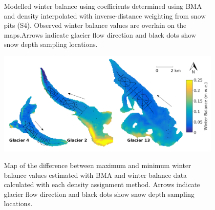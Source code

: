 \documentclass{sfuthesis}
\newcommand{\topomap}{Arrows indicate glacier flow direction and black dots show snow depth sampling locations. }
\begin{document}
\begin{figure}[H]
	\caption{Modelled winter balance using coefficients determined using BMA and density interpolated with inverse-distance weighting from snow pits (S4). Observed winter balance values are overlain on the maps.\topomap}
	\label{fig:BMSmodelledSWE}
\end{figure}

\begin{figure}[H]
	\centering
	\includegraphics[width =\textwidth]{BMS_SWEdifferenceMap.png}\\
	\caption{Map of the difference between maximum and minimum winter balance values estimated with BMA and winter balance data calculated with each density assignment method. \topomap}
	\label{fig:BMS_SWEdiffMap}
\end{figure} 
 
\end{document}

